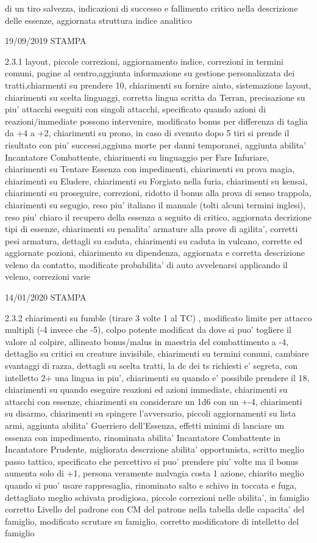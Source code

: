 \documentclass[a4paper,11pt,twoside,openany]{book}
\begin{document}
{{di un tiro salvezza, indicazioni di successo e fallimento critico nella descrizione delle essenze, aggiornata struttura indice analitico

19/09/2019 STAMPA

2.3.1 layout, piccole correzioni, aggiornamento indice, correzioni in termini comuni, pagine al centro,aggiunta informazione su gestione personalizzata dei tratti,chiarmenti su prendere 10, chiarimenti su fornire aiuto, sistemazione layout, chiarimenti su scelta linguaggi, corretta lingua scritta da Terran, precisazione su piu' attacchi eseguiti con singoli attacchi, specificato quando azioni di reazioni/immediate possono intervenire, modificato bonus per differenza di taglia da +4 a +2, chiarimenti su prono, in caso di svenuto dopo 5 tiri si prende il risultato con piu' successi,aggiuna morte per danni temporanei, aggiunta abilita' Incantatore Combattente, chiarimenti su linguaggio per Fare Infuriare, chiarimenti su Tentare Essenza con impedimenti, chiarimenti su prova magia, chiarimenti su Eludere, chiarimenti su Forgiato nella furia, chiarimenti su kensai, chiarimenti su proseguire, correzioni, ridotto il bonus alla prova di senso trappola, chiarimenti su segugio, reso piu' italiano il manuale (tolti alcuni termini inglesi), reso piu' chiaro il recupero della essenza a seguito di critico, aggiornata decrizione tipi di essenze, chiarimenti su penalita' armature alla prove di agilita', corretti pesi armatura, dettagli su caduta, chiarimenti su caduta in vulcano, corrette ed aggiornate pozioni, chiarimento su dipendenza, aggiornata e corretta descrizione veleno da contatto, modificate probabilita' di auto avvelenarsi applicando il veleno, correzioni varie

14/01/2020 STAMPA

2.3.2 chiarimenti su fumble (tirare 3 volte 1 al TC) , modificato limite per attacco multipli (-4 invece che -5), colpo potente modificat da dove si puo' togliere il valore al colpire, allineato bonus/malus in maestria del combattimento a -4, dettaglio su critici su creature invisibile, chiarimenti su termini comuni, cambiare svantaggi di razza, dettagli su scelta tratti, la dc dei ts richiesti e' segreta, con intelletto 2+ una lingua in piu', chiarimenti su quando e' possibile prendere il 18, chiarimenti su quando eseguire reazioni ed azioni immediate, chiarimenti su attacchi con essenze, chiarimenti su considerare un 1d6 con un +-4, chiarimenti su disarmo, chiarimenti su spingere l'avversario, piccoli aggiornamenti su lista armi, aggiunta abilita' Guerriero dell'Essenza, effetti minimi di lanciare un essenza con impedimento, rinominata abilita' Incantatore Combattente in Incantatore Prudente, migliorata descrzione abilita' opportunista, scritto meglio passo tattico, specificato che percettivo si puo' prendere piu' volte ma il bonus aumenta solo di +1, persona veramente malvagia costa 1 azione, chiarito meglio quando si puo' usare rappresaglia, rinominato salto e schivo in toccata e fuga, dettagliato meglio schivata prodigiosa, piccole correzioni nelle abilita', in famiglio corretto Livello del padrone con CM del patrone nella tabella delle capacita' del famiglio, modificato scrutare su famiglio, corretto modificatore di intelletto del famiglio

}}
\end{document}
